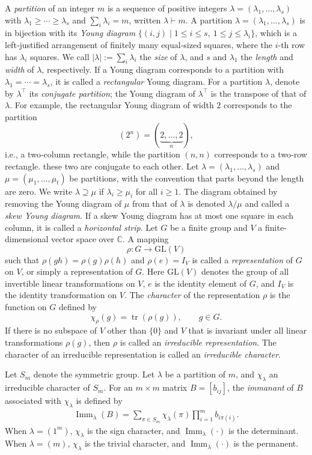 \documentclass[11pt,a4paper]{article}
\begin{document}
A {\em partition} of an integer $m$ is a sequence of positive integers $\lambda = (\lambda_1, \ldots, \lambda_s)$ with $\lambda_1\geq \cdots\geq\lambda_s$ and $\sum_i \lambda_i = m$, written $\lambda \vdash m$. A partition $\lambda = (\lambda_1, \ldots, \lambda_s)$ is in bijection with its {\em Young diagram} $\{(i,j)\mid 1\leq i\leq s,\ 1\leq j\leq\lambda_i\}$, which is a left‐justified arrangement of finitely many equal‐sized squares, where the $i$-th row has $\lambda_i$ squares. We call $|\lambda| := \sum_i \lambda_i$ the {\em size} of $\lambda$, and $s$ and $\lambda_1$ the {\em length} and {\em width} of $\lambda$, respectively. If a Young diagram corresponds to a partition with $\lambda_1 = \cdots = \lambda_s$, it is called a {\em rectangular} Young diagram. For a partition $\lambda$, denote by $\lambda^\top$ its {\em conjugate partition}; the Young diagram of $\lambda^\top$ is the transpose of that of $\lambda$. For example, the rectangular Young diagram of width $2$ corresponds to the partition
$$
  (2^n)=(\underbrace{2,\ldots,2}_{n}),
$$
i.e., a two‐column rectangle, while the partition $(n,n)$ corresponds to a two‐row rectangle. these two are conjugate to each other. Let $\lambda=(\lambda_1,\ldots,\lambda_s)$ and $\mu=(\mu_1,\ldots,\mu_t)$ be partitions, with the convention that parts beyond the length are zero. We write $\lambda\supseteq\mu$ if $\lambda_i\geq\mu_i$ for all $i\geq1$. The diagram obtained by removing the Young diagram of $\mu$ from that of $\lambda$ is denoted $\lambda/\mu$ and called a {\em skew Young diagram}. If a skew Young diagram has at most one square in each column, it is called a \textit{horizontal strip}. Let $G$ be a finite group and $V$ a finite‐dimensional vector space over $\mathbb{C}$. A mapping
\[
  \rho:G\longrightarrow \mathrm{GL}(V)
\]
such that $\rho(gh)=\rho(g)\rho(h)$ and $\rho(e)=I_V$ is called a {\em representation} of $G$ on $V$, or simply a representation of $G$. Here $\mathrm{GL}(V)$ denotes the group of all invertible linear transformations on $V$, $e$ is the identity element of $G$, and $I_V$ is the identity transformation on $V$. The {\em character} of the representation $\rho$ is the function on $G$ defined by
\[
  \chi_\rho(g)=\operatorname{tr}(\rho(g)),\qquad g\in G.
\]
If there is no subspace of $V$ other than $\{0\}$ and $V$ that is invariant under all linear transformations $\rho(g)$, then $\rho$ is called an {\em irreducible representation}. The character of an irreducible representation is called an {\em irreducible character}.

Let $S_m$ denote the symmetric group. Let $\lambda$ be a partition of $m$, and $\chi_\lambda$ an irreducible character of $S_m$. For an $m\times m$ matrix $B=[b_{ij}]$, the {\em immanant} of $B$ associated with $\chi_\lambda$ is defined by
\begin{eqnarray*}
  \operatorname{Imm}_\lambda(B)
  =\sum_{\pi\in S_m}\chi_{\lambda}(\pi)
    \prod_{i=1}^m b_{i\pi(i)}.
\end{eqnarray*}
When $\lambda=(1^m)$, $\chi_{\lambda}$ is the sign character, and $\operatorname{Imm}_\lambda(\cdot)$ is the determinant. When $\lambda=(m)$, $\chi_{\lambda}$ is the trivial character, and $\operatorname{Imm}_\lambda(\cdot)$ is the permanent.
\end{document}
